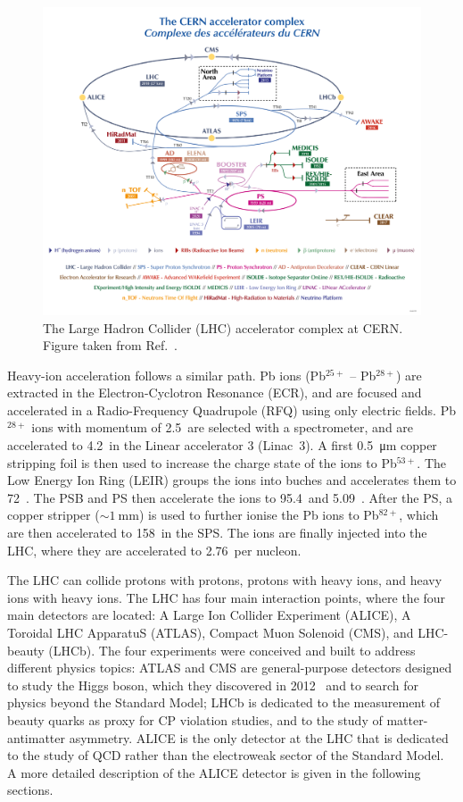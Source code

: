\begin{figure}[htb]
    \centering
    \includegraphics[width=\textwidth]{Figures/Chapter 3/LHC_Scheme.png}
    \caption{The Large Hadron Collider (LHC) accelerator complex at CERN. Figure taken from Ref.~\cite{Lopienska:2800984}.}
    \label{fig:LHC}
\end{figure}

Heavy-ion acceleration follows a similar path. Pb ions (Pb$^{25+}$ -- Pb$^{28+}$) are extracted in the Electron-Cyclotron Resonance (ECR), and are focused and accelerated in a Radio-Frequency Quadrupole (RFQ) using only electric fields. Pb$^{28+}$ ions with momentum of 2.5~\kevc are selected with a spectrometer, and are accelerated to 4.2~\mevc in the Linear accelerator 3 (Linac~3). A first \SI{0.5}{\micro\meter} copper stripping foil is then used to increase the charge state of the ions to Pb$^{53+}$. The Low Energy Ion Ring (LEIR) groups the ions into buches and accelerates them to 72~\mev. The PSB and PS then accelerate the ions to 95.4~\mev and 5.09~\gev. After the PS, a copper stripper ($\sim 1~\mathrm{mm}$) is used to further ionise the Pb ions to Pb$^{82+}$, which are then accelerated to 158~\gev in the SPS. The ions are finally injected into the LHC, where they are accelerated to 2.76~\tev per nucleon.

The LHC can collide protons with protons, protons with heavy ions, and heavy ions with heavy ions. The LHC has four main interaction points, where the four main detectors are located: A Large Ion Collider Experiment (ALICE), A Toroidal LHC ApparatuS (ATLAS), Compact Muon Solenoid (CMS), and LHC-beauty (LHCb). The four experiments were conceived and built to address different physics topics: ATLAS and CMS are general-purpose detectors designed to study the Higgs boson, which they discovered in 2012~\cite{ATLAS:2012yve,CMS:2012qbp} and to search for physics beyond the Standard Model; LHCb is dedicated to the measurement of beauty quarks as proxy for CP violation studies, and to the study of matter-antimatter asymmetry. ALICE is the only detector at the LHC that is dedicated to the study of QCD rather than the electroweak sector of the Standard Model. A more detailed description of the ALICE detector is given in the following sections.

